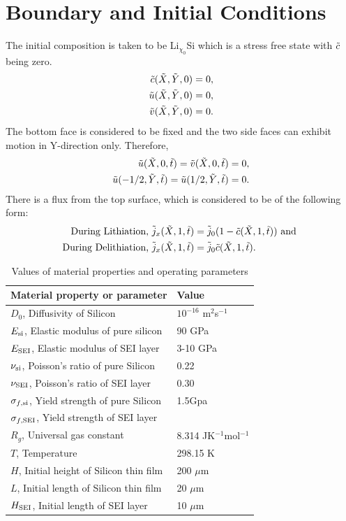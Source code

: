 \section{Boundary and Initial Conditions}
The initial composition is taken to be Li$_{\chi_{0}}$Si which is a stress free state with $\tilde{c}$ being zero.
\begin{align}
    \tilde{c}(\tilde{X}, \tilde{Y}, 0) = 0, \\
    \tilde{u}(\tilde{X}, \tilde{Y}, 0) = 0,\\
    \tilde{v}(\tilde{X}, \tilde{Y}, 0) = 0.
\end{align}
The bottom face is considered to be fixed and the two side faces can exhibit motion in Y-direction only. Therefore,
\begin{align}
    \tilde{u}(\tilde{X}, 0, \tilde{t}) = \tilde{v}(\tilde{X}, 0, \tilde{t}) = 0, \\
    \tilde{u}(-1/2, \tilde{Y}, \tilde{t}) =  \tilde{u}(1/2, \tilde{Y}, \tilde{t}) = 0.
\end{align}
There is a flux from the top surface, which is considered to be of the following form: 
\begin{align}
    \text{During Lithiation, }\tilde{j}_x(\tilde{X}, 1, \tilde{t}) &= \tilde{j}_0 (1 - \tilde{c}(\tilde{X}, 1, \tilde{t})) \text{ and } \\
    \text{During Delithiation, }\tilde{j}_x(\tilde{X}, 1, \tilde{t}) &= \tilde{j}_0 \tilde{c}(\tilde{X}, 1, \tilde{t}).
\end{align} 

\begin{table}[H]
\caption{Values of material properties and operating parameters}
\vspace{1em}
\begin{tabularx}{\textwidth}{Xl}
\hline
  {Material property or parameter} & {Value} \\
\hline
$D_0$, Diffusivity of Silicon & $10^{-16}$ m$^{2}$s$^{-1}$ \\
$E_{{\rm{si}}}$, Elastic modulus of pure silicon & 90 GPa \\
$E_{\rm{SEI}}$, Elastic modulus of SEI layer & 3-10 GPa \\
$\nu_{{\rm{si}}}$, Poisson's ratio of pure Silicon & 0.22\\
$\nu_{\rm{SEI}}$, Poisson's ratio of SEI layer & 0.30\\
$\sigma_{f,{\rm{si}}}$, Yield strength of pure Silicon & 1.5Gpa\\
$\sigma_{f, {\rm{SEI}}}$, Yield strength of SEI layer & \\
$R_g$, Universal gas constant & 8.314 JK$^{-1}$mol$^{-1}$\\
$T$, Temperature & 298.15 K\\
$H$, Initial height of Silicon thin film & 200 $\mu$m\\
$L$, Initial length of Silicon thin film & 20 $\mu$m\\
$H_{\rm{SEI}}$, Initial length of SEI layer & 10 $\mu$m
\end{tabularx}
\end{table}



